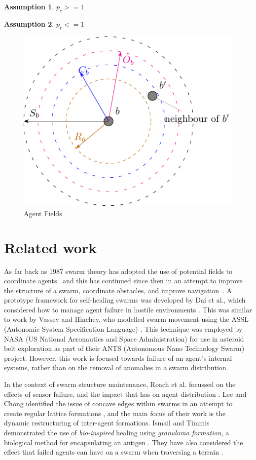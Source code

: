 \documentclass[12pt,a4paper]{IEEEtran}
\newtheorem{assumption}{Assumption}
\begin{document}
\begin{assumption}
	$p_c >= 1$
\end{assumption}
\begin{assumption}
	$p_r <= 1$
\end{assumption}
\begin{figure}[H]
	\centering
	\includegraphics[width=0.8\linewidth]{figures/stableswarm}
	\caption[Agent Fields]{Agent Fields}
	\label{fig:stableswarm}
\end{figure}

\section{Related work}

As far back as 1987 swarm theory has adopted the use of potential fields to coordinate agents~\cite{REY:87} and this has continued since then in an attempt to improve the structure of a swarm, coordinate obstacles, and  improve navigation~\cite{BAFVM:06,BAF:06,BFV:07,BM:09,eliot2018metric,VG:05,HC:09,SW:03,Son2017}. A prototype framework for self-healing swarms was developed by Dai et al., which considered how to manage agent failure in hostile environments \cite{DHMRZ:06}. This was similar to work by Vassev and Hinchey, who modelled swarm movement using the ASSL (Autonomic System Specification Language) \cite{VH:09}. This technique was employed by NASA (US National Aeronautics and Space Administration) for use in asteroid belt exploration as part of their ANTS (Autonomous Nano Technology Swarm) project. However, this work is focused towards failure of an agent's internal systems, rather than on the removal of anomalies in a swarm distribution. 

In the context of swarm structure maintenance, Roach et al. focussed on the effects of sensor failure, and the impact that has on agent distribution \cite{RMT:15}. Lee and Chong identified the issue of concave edges within swarms in an attempt to create regular lattice formations \cite{GN:08}, and the main focus of their work is the dynamic restructuring of inter-agent formations. Ismail and Timmis demonstrated the use of \textit{bio-inspired} healing using \textit{granuloma formation}, a biological method for encapsulating an antigen \cite{IT:10}. They have also considered the effect that failed agents can have on a swarm when traversing a terrain \cite{TIBW:16}. 
\end{document}
